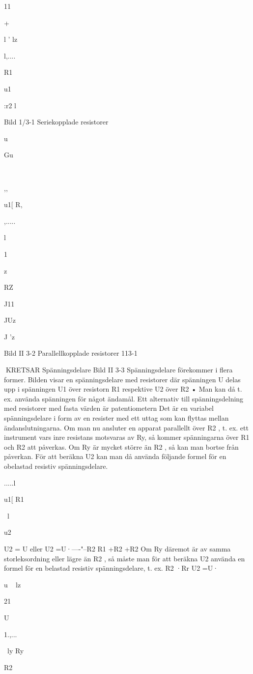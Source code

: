 \documentclass[a4paper,twoside,twocolumn,openright]{book}
\begin{document}
{{{{11

+

l '
lz

l,....

R1

u1

:r2
l

Bild 1/3-1 Seriekopplade resistorer

u

Gu

~

,,

u1[ R,

,.....

l

1

z

RZ

J11

JUz

J 'z

Bild II 3-2 Parallellkopplade resistorer
113-1

KRETSAR
Spänningsdelare
Bild II 3-3
Spänningsdelare förekommer i flera former.
Bilden visar en spänningsdelare med
resistorer där spänningen U delas upp i
spänningen U1 över resistorn R1 respektive
U2 över R2 • Man kan då t. ex. använda spänningen
för något ändamål.
Ett alternativ till spänningsdelning med
resistorer med fasta värden är patentiometern Det är en variabel spänningsdelare i
form av en resister med ett uttag som kan
flyttas mellan ändanslutningarna.
Om man nu ansluter en apparat parallellt
över R2 , t. ex. ett instrument vars inre resistans motsvaras av Ry, så kommer spänningarna över R1 och R2 att påverkas.
Om Ry är mycket större än R2 , så kan
man bortse från påverkan. För att beräkna
U2 kan man då använda följande formel för
en obelastad resistiv spänningsdelare.

.....l

u1[ R1

~l

u2

U2 =
U
eller
U2 =U·----"--R2 R1 +R2
+R2
Om Ry däremot är av samma storleksordning eller lägre än R2 , så måste man för
att beräkna U2 använda en formel för en
belastad resistiv spänningsdelare, t. ex.
R2 ·Rr
U2 =U·

u
~ lz

21

U

1.,...

~ly
Ry

R2

}}}}
\end{document}
